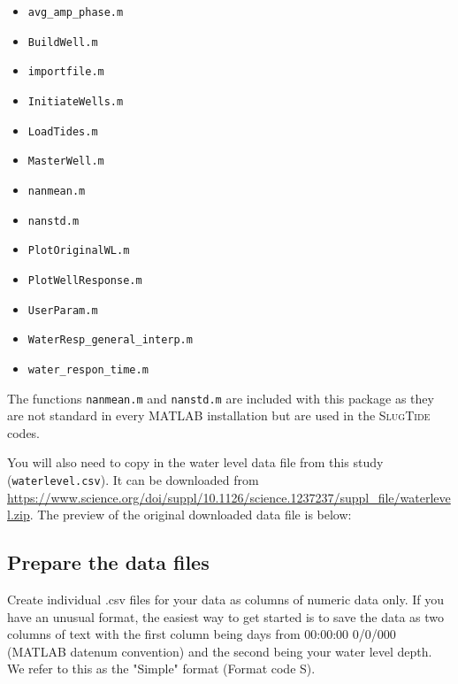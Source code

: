 \documentclass[11pt]{article}
\begin{document}
\begin{itemize}
    \item \texttt{avg\_amp\_phase.m}             
    \item \texttt{BuildWell.m}
    \item \texttt{importfile.m}
    \item \texttt{InitiateWells.m}
    \item \texttt{LoadTides.m}
    \item \texttt{MasterWell.m}
    \item \texttt{nanmean.m}
    \item \texttt{nanstd.m}
    \item \texttt{PlotOriginalWL.m}
    \item \texttt{PlotWellResponse.m}
    \item \texttt{UserParam.m}
    \item \texttt{WaterResp\_general\_interp.m}
    \item \texttt{water\_respon\_time.m}
\end{itemize}

The functions \texttt{nanmean.m} and \texttt{nanstd.m} are included with this package as they are
not standard in every MATLAB installation but are used in the \textsc{SlugTide} codes.

You will also need to copy in the water level data file from this study
(\texttt{waterlevel.csv}). It can be downloaded from
\url{https://www.science.org/doi/suppl/10.1126/science.1237237/suppl_file/waterlevel.zip}.
The preview of the original downloaded data file is below:



\subsection{Prepare the data files}

Create individual .csv files for your data as columns of numeric data only. If
you have an unusual format, the easiest way to get started is to save the data
as two columns of text with the first column being days from 00:00:00 0/0/000
(MATLAB datenum convention) and the second being your water level depth. We
refer to this as the "Simple" format (Format code S). 
\end{document}
